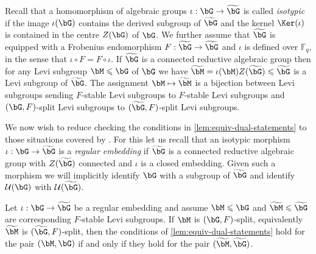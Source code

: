 \documentclass[eqthmnum,nocolour,skinny]{jt-calcs}
\begin{document}
\begin{pa}\label{pa:isotypic-morphisms}
Recall that a homomorphism of algebraic groups $\iota : \bG \to \widetilde{\bG}$ is called \emph{isotypic} if the image $\iota(\bG)$ contains the derived subgroup of $\widetilde{\bG}$ and the kernel $\Ker(\iota)$ is contained in the centre $Z(\bG)$ of $\bG$. We further assume that $\widetilde{\bG}$ is equipped with a Frobenius endomorphism $F : \widetilde{\bG} \to \widetilde{\bG}$ and $\iota$ is defined over $\mathbb{F}_q$, in the sense that $\iota\circ F = F\circ\iota$. If $\widetilde{\bG}$ is a connected reductive algebraic group then for any Levi subgroup $\bM \leqslant \bG$ of $\bG$ we have $\widetilde{\bM} = \iota(\bM)Z(\widetilde{\bG}) \leqslant \widetilde{\bG}$ is a Levi subgroup of $\widetilde{\bG}$. The assignment $\bM \mapsto \widetilde{\bM}$ is a bijection between Levi subgroups sending $F$-stable Levi subgroups to $F$-stable Levi subgroups and $(\bG,F)$-split Levi subgroups to $(\widetilde{\bG},F)$-split Levi subgroups.
\end{pa}

\begin{pa}\label{pa:reg-embedding}
We now wish to reduce checking the conditions in \cref{lem:equiv-dual-statements} to those situations covered by \cite{bezrukavnikov-liebeck-shalev-tiep:2017:character-bounds-grps-Lie-type}. For this let us recall that an isotypic morphism $\iota : \bG \to \widetilde{\bG}$ is a \emph{regular embedding} if $\widetilde{\bG}$ is a connected reductive algebraic group with $Z(\widetilde{\bG})$ connected and $\iota$ is a closed embedding. Given such a morphism we will implicitly identify $\bG$ with a subgroup of $\widetilde{\bG}$ and identify $\mathcal{U}(\bG)$ with $\mathcal{U}(\widetilde{\bG})$.
\end{pa}

\begin{prop}\label{prop:split-red-to-conn-centre}
Let $\iota : \bG \to \widetilde{\bG}$ be a regular embedding and assume $\bM \leqslant \bG$ and $\widetilde{\bM}\leqslant \widetilde{\bG}$ are corresponding $F$-stable Levi subgroups. If $\bM$ is $(\bG,F)$-split, equivalently $\widetilde{\bM}$ is $(\widetilde{\bG},F)$-split, then the conditions of  \cref{lem:equiv-dual-statements} hold for the pair $(\bM,\bG)$ if and only if they hold for the pair $(\widetilde{\bM},\widetilde{\bG})$.
\end{prop}
\end{document}
